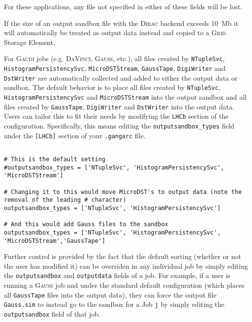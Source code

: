 \documentclass{howto}
\def\gaudi {\textsc{Gaudi}\xspace}
\def\davinci {\textsc{DaVinci}\xspace}
\def\dirac {\textsc{Dirac}\xspace}
\def\gauss {\textsc{Gauss}\xspace}
\def\grid {\textsc{Grid}\xspace}
\begin{document}
For these applications, any file not specified in either of these fields 
will be lost.

\begin{notice}
  If the size of an output sandbox file with the \dirac backend exceeds 10~Mb 
  it will automatically be treated as output data instead and copied to a \grid
  Storage Element.
\end{notice}

For \gaudi jobs (e.g. \davinci, \gauss, etc.), all files created by 
\texttt{NTupleSvc}, \texttt{HistogramPersistencySvc}, 
\texttt{MicroDSTStream},
\texttt{GaussTape}, \texttt{DigiWriter} and \texttt{DstWriter} are 
automatically collected and added to either the output data or sandbox.
The default behavior is to place all files created by 
\texttt{NTupleSvc}, \texttt{HistogramPersistencySvc} and
\texttt{MicroDSTStream} into the output sandbox and all files created by 
\texttt{GaussTape}, \texttt{DigiWriter} and \texttt{DstWriter} into the 
output data. Users can tailor this to fit their needs by modifying the
\texttt{LHCb} section of the configuration. Specifically, this means 
editing the \texttt{outputsandbox_types} field under the \texttt{[LHCb]}
section of your \texttt{.gangarc} file.

\begin{verbatim}

# This is the default setting
#outputsandbox_types = ['NTupleSvc', 'HistogramPersistencySvc', 'MicroDSTStream']

# Changing it to this would move MicroDST's to output data (note the removal of the leading # character)
outputsandbox_types = ['NTupleSvc', 'HistogramPersistencySvc']

# And this would add Gauss files to the sandbox
outputsandbox_types = ['NTupleSvc', 'HistogramPersistencySvc', 'MicroDSTStream','GaussTape']

\end{verbatim}

Further control is provided by the fact that the default sorting (whether or 
not the user has modified it) can be overriden in any individual job by 
simply editing the \texttt{outputsandbox} and \texttt{outputdata} fields of
a job. For example, if a user is running a \gauss job and under
the standard default configuration (which places all \texttt{GaussTape} files
into the output data), they can force the output file \texttt{Gauss.sim} to
instead go to the sandbox for a Job \texttt{j} by simply editing the 
\texttt{outputsandbox} field of that job.
\end{document}
